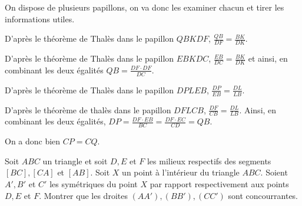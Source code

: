 \begin{sol}
\begin{center}
\end{center}

On dispose de plusieurs papillons, on va donc les examiner chacun et tirer les informations utiles.

D'après le théorème de Thalès dans le papillon $QBKDF$, $\frac{QB}{DF}=\frac{BK}{DK}$.

D'après le théorème de Thalès dans le papillon $EBKDC$, $\frac{EB}{DC}=\frac{BK}{DK}$ et ainsi, en combinant les deux égalités $QB=\frac{DF \cdot DF}{DC}$.

D'après le théorème de Thalès dans le papillon $DPLEB$, $\frac{DP}{EB}=\frac{DL}{LB}$.

D'après le théorème de thalès dans le papillon $DFLCB$, $\frac{DF}{CB}=\frac{DL}{LB}$. Ainsi, en combinant les deux égalités, $DP=\frac{DF\cdot EB}{BC}=\frac{DF\cdot EC}{CD}=QB$.

On a donc bien $CP=CQ$.

\end{sol}

\begin{exo}
Soit $ABC$ un triangle et soit $D,E$ et $F$ les milieux respectifs des segments $[BC], [CA]$ et $[AB]$. Soit $X$ un point à l'intérieur du triangle $ABC$. Soient $A',B'$ et $C'$ les symétriques du point $X$ par rapport respectivement aux points $D,E$ et $F$. Montrer que les droites $(AA'),(BB'),(CC')$ sont concourrantes.
\end{exo}

